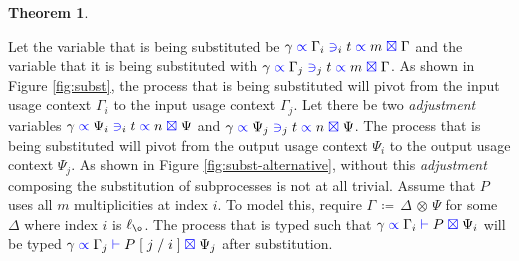 \documentclass[a4paper,UKenglish,cleveref, autoref, thm-restate,authorcolumns]{lipics-v2019}
\theoremstyle{definition}
\newtheorem{nitheorem}[theorem]{Theorem}
\newcommand{\type}[1]{\textcolor{blue}{\operatorname{#1}}}
\newcommand{\subst}[3]{#1 \; [ \; #2 \; / \;#3 \;]}
\newcommand{\opctx}[3]{#1 \, \coloneqq \, #2 \, \otimes \, #3}
\newcommand{\lz}{\ell_{\o}}
\newcommand{\types}[4]{#1 \; \type{\propto} \; #2 \; \type{\vdash} \; #3 \; \type{\boxtimes} \; #4}
\newcommand{\contains}[6]{#1 \; \type{\propto} \; #2 \; \type{\ni}_{#3} \; #4 \; \type{\propto} \; #5 \; \type{\boxtimes} \; #6}
\begin{document}
\begin{nitheorem}
  \label{thm:subst-generalization}

  Let the variable that is being substituted be $\contains{\gamma}{\Gamma_i}{i}{t}{m}{\Gamma}$ and the variable that it is being substituted with $\contains{\gamma}{\Gamma_j}{j}{t}{m}{\Gamma}$.
  As shown in Figure \ref{fig:subst}, the process that is being substituted will pivot from the input usage context $\Gamma_i$ to the input usage context $\Gamma_j$.
  Let there be two \emph{adjustment} variables $\contains{\gamma}{\Psi_i}{i}{t}{n}{\Psi}$ and $\contains{\gamma}{\Psi_j}{j}{t}{n}{\Psi}$.
  The process that is being substituted will pivot from the output usage context $\Psi_i$ to the output usage context $\Psi_j$.
  As shown in Figure \ref{fig:subst-alternative}, without this \emph{adjustment} composing the substitution of subprocesses is not at all trivial.
  Assume that $P$ uses all $m$ multiplicities at index $i$.
  To model this, require $\opctx{\Gamma}{\Delta}{\Psi}$ for some $\Delta$ where index $i$ is $\lz$.
  The process that is typed such that $\types{\gamma}{\Gamma_i}{P}{\Psi_i}$ will be typed $\types{\gamma}{\Gamma_j}{\subst{P}{j}{i}}{\Psi_j}$ after substitution.
\end{nitheorem}
\end{document}
